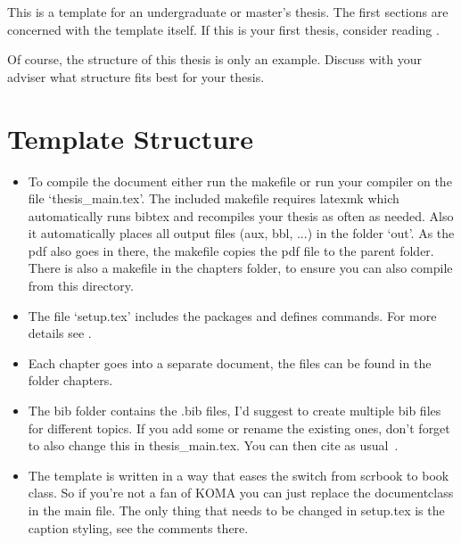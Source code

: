 This is a template for an undergraduate or master's thesis.
The first sections are concerned with the template itself. If this is your first
thesis, consider reading .

Of course, the structure of this
thesis is only an example.
Discuss with your adviser what structure fits best for your thesis.

\section{Template Structure}
\begin{itemize}
    \item To compile the document either run the makefile or run your compiler on the file `thesis\_main.tex'. The included makefile requires latexmk which automatically runs bibtex and recompiles your thesis as often as needed. Also it automatically places all output files (aux, bbl, ...) in the folder `out'. As the pdf also goes in there, the makefile copies the pdf file to the parent folder. There is also a makefile in the chapters folder, to ensure you can also compile from this directory.

    \item The file `setup.tex' includes the packages and defines commands. For more details see .

    \item Each chapter goes into a separate document, the files can be found in the folder chapters.

    \item The bib folder contains the .bib files, I'd suggest to create multiple bib files for different topics. If you add some or rename the existing ones, don't forget to also change this in thesis\_main.tex. You can then cite as usual~\cite{kingma2014adam, bromley1993siamesesignature,muja2009flann}.

    \item The template is written in a way that eases the switch from scrbook to book class. So if you're not a fan of KOMA you can just replace the documentclass in the main file. The only thing that needs to be changed in setup.tex is the caption styling, see the comments there.
\end{itemize}



